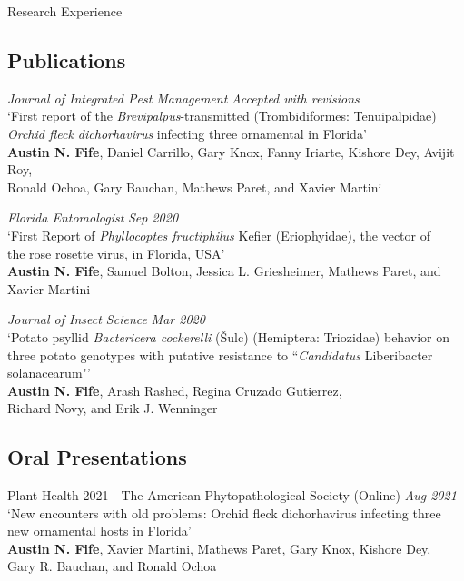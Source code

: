 \documentclass{resume} %
\begin{document}
\begin{rSection}{Research Experience}
\subsection*{Publications}
\textit{Journal of Integrated Pest Management} \hfill {\em \textit{Accepted with revisions}}\\
`First report of the \textit{Brevipalpus}-transmitted (Trombidiformes: Tenuipalpidae)\\
\textit{Orchid fleck dichorhavirus} infecting three ornamental in Florida'\\
\textbf{Austin N. Fife}, Daniel Carrillo, Gary Knox, Fanny Iriarte, Kishore Dey, Avijit Roy,\\
 Ronald Ochoa, Gary Bauchan, Mathews Paret, and Xavier Martini\\ \hfill
 
\textit{Florida Entomologist} \hfill {\em \textit{Sep 2020}}\\
`First Report of \textit{Phyllocoptes fructiphilus} Kefier (Eriophyidae), the vector of\\
the rose rosette virus, in Florida, USA'\\
\textbf{Austin N. Fife}, Samuel Bolton, Jessica L. Griesheimer, Mathews Paret, and Xavier Martini\\ \hfill

\textit{Journal of Insect Science} \hfill {\em \textit{Mar 2020}}\\
`Potato psyllid \textit{Bactericera cockerelli} (Šulc) (Hemiptera: Triozidae) behavior on\\
 three potato genotypes with putative resistance to ``\textit{Candidatus} Liberibacter solanacearum"'\\
\textbf{Austin N. Fife}, Arash Rashed, Regina Cruzado Gutierrez,\\ Richard Novy, and Erik J. Wenninger\\


\subsection*{Oral Presentations}
Plant Health 2021 - The American Phytopathological Society (Online) \hfill {\em \textit{Aug 2021}}\\
`New encounters with old problems: Orchid fleck dichorhavirus infecting three new ornamental hosts in Florida'\\
\textbf{Austin N. Fife}, Xavier Martini, Mathews Paret, Gary Knox, Kishore Dey,\\
Gary R. Bauchan, and Ronald Ochoa\\ \hfill


\end{rSection}
\end{document}

